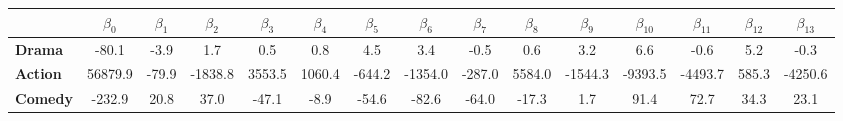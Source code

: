 \begin{tabular}{|l|c|c|c|c|c|c|c|c|c|c|c|c|c|c|}
\hline
&\textbf{$\beta_{0}$}&\textbf{$\beta_{1}$}&\textbf{$\beta_{2}$}&\textbf{$\beta_{3}$}&\textbf{$\beta_{4}$}&\textbf{$\beta_{5}$}&\textbf{$\beta_{6}$}&\textbf{$\beta_{7}$}&\textbf{$\beta_{8}$}&\textbf{$\beta_{9}$}&\textbf{$\beta_{10}$}&\textbf{$\beta_{11}$}&\textbf{$\beta_{12}$}&\textbf{$\beta_{13}$}\\\hline
\textbf{Drama}&-80.1&-3.9&1.7&0.5&0.8&4.5&3.4&-0.5&0.6&3.2&6.6&-0.6&5.2&-0.3\\\hline
\textbf{Action}&56879.9&-79.9&-1838.8&3553.5&1060.4&-644.2&-1354.0&-287.0&5584.0&-1544.3&-9393.5&-4493.7&585.3&-4250.6\\\hline
\textbf{Comedy}&-232.9&20.8&37.0&-47.1&-8.9&-54.6&-82.6&-64.0&-17.3&1.7&91.4&72.7&34.3&23.1\\\hline
\end{tabular}
